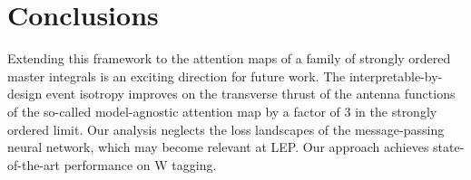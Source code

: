 \section{Conclusions}\label{sec:conclusions}

Extending this framework to the attention maps of a family of strongly
ordered master integrals is an exciting direction for future work. The
interpretable-by-design event isotropy improves on the transverse thrust
of the antenna functions of the so-called model-agnostic attention map
by a factor of 3 in the strongly ordered limit. Our analysis neglects
the loss landscapes of the message-passing neural network, which may
become relevant at LEP. Our approach achieves state-of-the-art
performance on W tagging.

